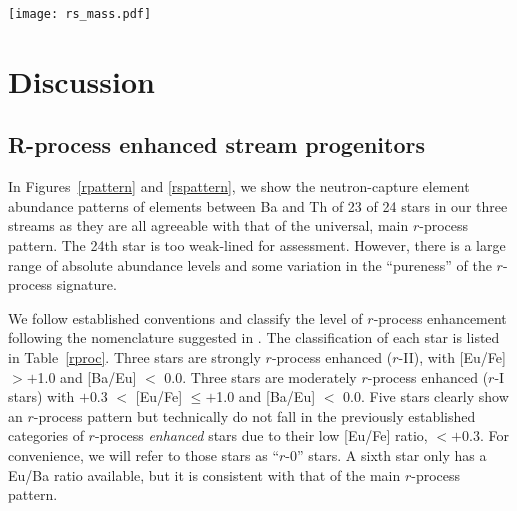 \documentclass[twocolumn]{aastex63}
\begin{document}
\begin{figure*}[!ht]
 \begin{center}
  \texttt{[image: rs\_mass.pdf]} 
 \end{center}
\end{figure*}


\section{Discussion} \label{rproc_streams}
\subsection{R-process enhanced stream progenitors}

In Figures~\ref{rpattern} and \ref{rspattern}, we show the neutron-capture element abundance patterns of elements between Ba and Th of 23 of 24 stars in our three streams as they are all agreeable with that of the universal, main $r$-process pattern. The 24th star is too weak-lined for assessment. However, there is a large range of absolute abundance levels and some variation in the ``pureness'' of the  $r$-process signature.

We follow established conventions and classify the level of $r$-process enhancement following the nomenclature suggested in \citet{frebel18}. The classification of each star is listed in Table~\ref{rproc}. 
Three stars are strongly $r$-process enhanced ($r$-II), with [Eu/Fe] $>+$1.0 and [Ba/Eu] $<$ 0.0. Three stars are moderately $r$-process enhanced ($r$-I stars) with $+$0.3 $<$ [Eu/Fe] $\leq+$1.0 and [Ba/Eu] $<$ 0.0. 
Five stars clearly show an $r$-process pattern but technically do not fall in the previously established categories of $r$-process \textit{enhanced} stars due to their low [Eu/Fe] ratio, $< +0.3$. For convenience, we will refer to those stars as ``$r$-0'' stars. A sixth star only has a Eu/Ba ratio available, but it is consistent with that of the main $r$-process pattern.
\end{document}
